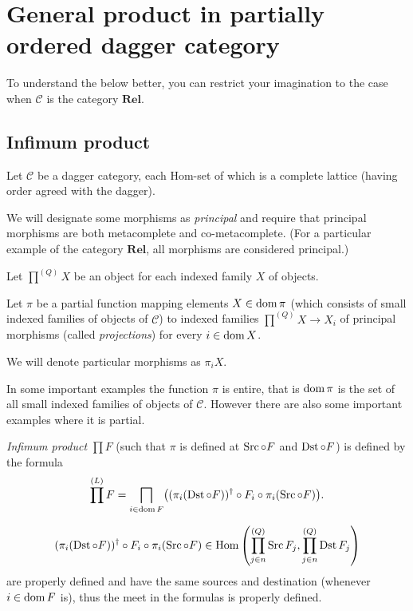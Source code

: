 \section{General product in partially ordered dagger category}

To understand the below better, you can restrict your imagination to the case
when $\mathcal{C}$ is the category $\mathbf{Rel}$.

\subsection{Infimum product}

Let $\mathcal{C}$ be a dagger category, each Hom-set of which is a complete
lattice (having order agreed with the dagger).

We will designate some morphisms as \emph{principal} and require that
principal morphisms are both metacomplete and co-metacomplete. (For a
particular example of the category $\mathbf{Rel}$, all morphisms are
considered principal.)

Let $\prod^{(Q)} X$ be an object for each indexed family $X$ of objects.

Let $\pi$ be a partial function mapping elements $X \in \operatorname{dom} \pi$ (which
consists of small indexed families of objects of $\mathcal{C}$) to indexed
families $\prod^{(Q)} X \rightarrow X_i$ of principal morphisms (called
\emph{projections}) for every $i \in \operatorname{dom} X$.

We will denote particular morphisms as $\pi_i X$.

\begin{rem}
  In some important examples the function $\pi$ is entire, that is $\operatorname{dom}
  \pi$ is the set of all small indexed families of objects of $\mathcal{C}$.
  However there are also some important examples where it is partial.
\end{rem}

\begin{defn}
  \emph{Infimum product} $\prod F$ (such that $\pi$ is defined at $\operatorname{Src}\circ F$ and $\operatorname{Dst}\circ F$) is defined
  by the formula
  \[ \prod^{(L)} F = \bigsqcap_{i \in \operatorname{dom} F} \bigl((\pi_i(\operatorname{Dst}\circ F))^{\dagger} \circ F_i \circ \pi_i(\operatorname{Src}\circ F)\bigr) . \]
\end{defn}

\begin{rem}
  \[ (\pi_i(\operatorname{Dst}\circ F))^{\dagger} \circ F_i \circ
  \pi_i(\operatorname{Src}\circ F) \in \operatorname{Hom} \left(
  \prod^{(Q)}_{j \in n} \operatorname{Src} F_j , \prod^{(Q)}_{j \in n} \operatorname{Dst} F_j
  \right) \] are properly defined and have the same sources and destination
  (whenever $i \in \operatorname{dom} F$ is), thus the meet in the formulas is
  properly defined.
\end{rem}

